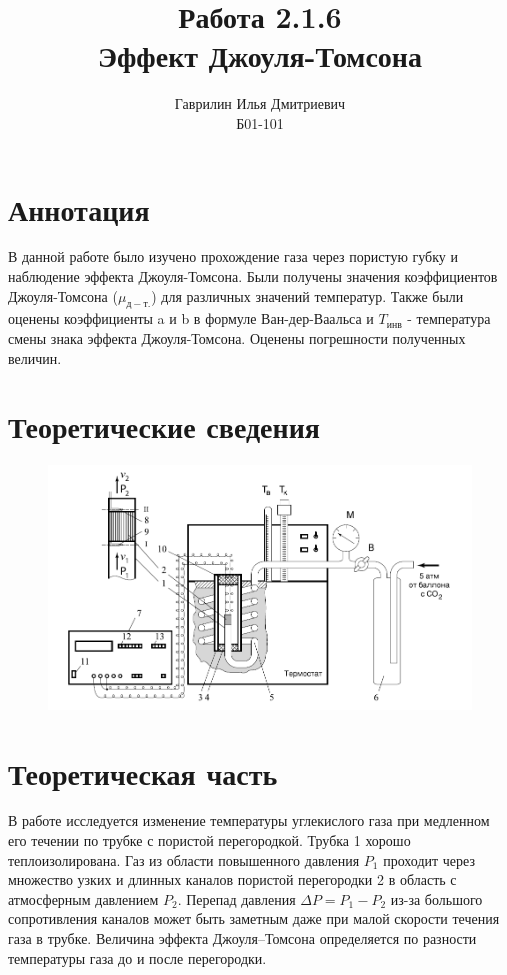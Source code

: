 \documentclass[a4paper, 12pt]{article}%
\author{Гаврилин Илья Дмитриевич \\
	Б01-101}
\title{\textbf{Работа 2.1.6 \\ 
		Эффект Джоуля-Томсона}}
\begin{document}
	\maketitle
	\section{Аннотация}
	В данной работе было изучено прохождение газа через пористую губку и наблюдение эффекта Джоуля-Томсона. Были получены значения коэффициентов Джоуля-Томсона ($\mu _{д-т.}$) для различных значений температур. Также были оценены коэффициенты a и b в формуле Ван-дер-Ваальса и $T_{инв}$ - температура смены знака эффекта Джоуля-Томсона. Оценены погрешности полученных величин.	
	\section{Теоретические сведения}
	\begin{figure}[H]
		\includegraphics[width = \linewidth]{instrument}
	\end{figure}
	
	
	\section*{Теоретическая часть}
	
	В работе исследуется изменение температуры углекислого газа при медленном его течении по трубке с пористой перегородкой. Трубка 1 хорошо теплоизолирована. Газ из области повышенного давления $P_1$ проходит через множество узких и длинных каналов пористой перегородки 2 в область с атмосферным давлением $P_2$. Перепад давления  $\Delta P = P_1 - P_2$ из-за большого сопротивления
	каналов может быть заметным даже при малой скорости течения газа в трубке. Величина эффекта Джоуля–Томсона определяется по разности температуры газа до и после перегородки.
	
\end{document}
